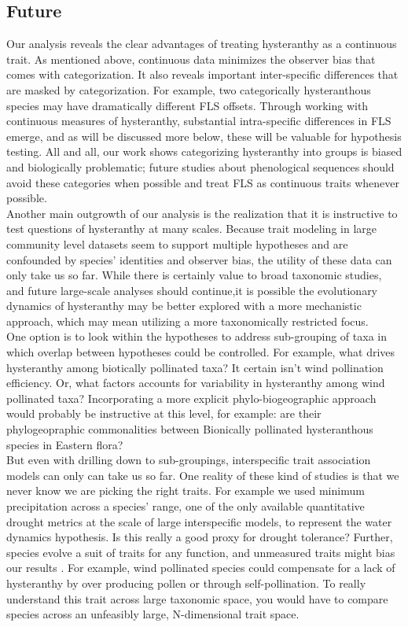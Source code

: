 \documentclass[12pt]{article}\usepackage[]{graphicx}\usepackage[]{color}
\begin{document}
\subsection*{Future}
\indent\indent Our analysis reveals the clear advantages of treating hysteranthy as a continuous trait. As mentioned above, continuous data minimizes the observer bias that comes with categorization. It also reveals important inter-specific differences that are masked by categorization. For example, two categorically hysteranthous species may have dramatically different FLS offsets. Through working with continuous measures of hysteranthy, substantial intra-specific differences in FLS emerge, and as will be discussed more below, these will be valuable for hypothesis testing. All and all, our work shows categorizing hysteranthy into groups is biased and biologically problematic; future studies about phenological sequences should avoid these categories when possible and treat FLS as continuous traits whenever possible.\\
 \indent Another main outgrowth of our analysis is the realization that it is instructive to test questions of hysteranthy at many scales. Because trait modeling in large community level datasets seem to support multiple hypotheses and are confounded by species' identities and observer bias, the utility of these data can only take us so far. While there is certainly value to broad taxonomic studies, and future large-scale analyses should continue,it is possible the evolutionary dynamics of hysteranthy may be better explored with a more mechanistic approach, which may mean utilizing a more taxonomically restricted focus.\\
\indent One option is to look within the hypotheses to address sub-grouping of taxa in which overlap between hypotheses could be controlled. For example, what drives hysteranthy among biotically pollinated taxa? It certain isn't wind pollination efficiency. Or, what factors accounts for variability in hysteranthy among wind pollinated taxa? Incorporating a more explicit phylo-biogeographic approach would probably be instructive at this level, for example: are their phylogeopraphic commonalities between Bionically pollinated hysteranthous species in Eastern flora?\\
\indent But even with drilling down to sub-groupings, interspecific trait association models can only can take us so far. One reality of these kind of studies is that we never know we are picking the right traits. For example we used minimum precipitation across a species' range, one of the only available quantitative drought metrics at the scale of large interspecific models, to represent the water dynamics hypothesis. Is this really a good proxy for drought tolerance? Further, species evolve a suit of traits for any function, and unmeasured traits might bias our results \citep{Davies2019}. For example, wind pollinated species could compensate for a lack of hysteranthy by over producing pollen or through self-pollination. To really understand this trait across large taxonomic space, you would have to compare species across an unfeasibly large, N-dimensional trait space.\\
\end{document}
